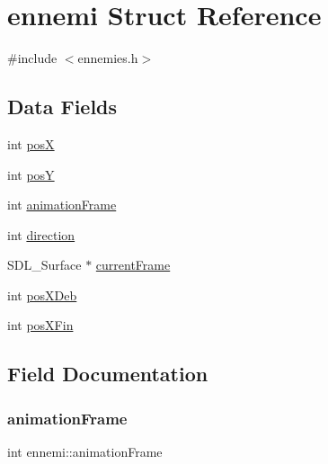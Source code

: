 \hypertarget{structennemi}{}\section{ennemi Struct Reference}
\label{structennemi}


{\ttfamily \#include $<$ennemies.\+h$>$}

\subsection*{Data Fields}
\begin{DoxyCompactItemize}
\item 
int \hyperlink{structennemi_aa20d1f2c58368aa075a35cf5f2cad931}{posX}
\item 
int \hyperlink{structennemi_a4b6aa99c085e81e3dec2df8d985f957a}{posY}
\item 
int \hyperlink{structennemi_aaf749231f2819d6bd2c974e47712a483}{animation\+Frame}
\item 
int \hyperlink{structennemi_aa1f57a616910ffd5799f1097a3160e0b}{direction}
\item 
S\+D\+L\+\_\+\+Surface $\ast$ \hyperlink{structennemi_a6a5af0f9f9357971d04304b866b87d12}{current\+Frame}
\item 
int \hyperlink{structennemi_afd42e01f19c7fcec3cb21dca8b4cf346}{pos\+X\+Deb}
\item 
int \hyperlink{structennemi_a6da098ed49233503a361e3dbe184e3f4}{pos\+X\+Fin}
\end{DoxyCompactItemize}


\subsection{Field Documentation}
\mbox{\label{structennemi_aaf749231f2819d6bd2c974e47712a483}} 
\subsubsection{\texorpdfstring{animation\+Frame}{animationFrame}}
{\footnotesize\ttfamily int ennemi\+::animation\+Frame}

\mbox{\label{structennemi_a6a5af0f9f9357971d04304b866b87d12}} 
